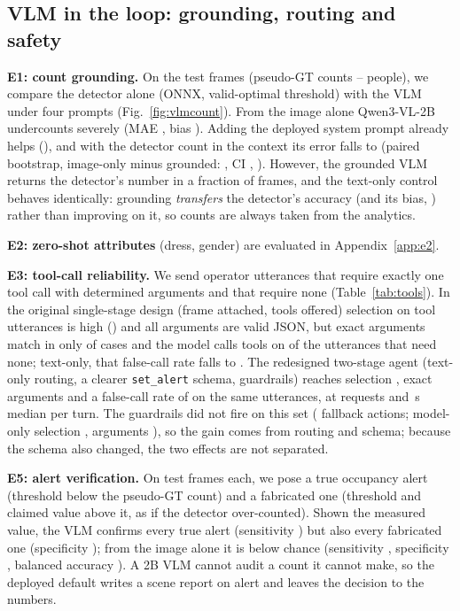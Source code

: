 \ifHaveVLM
\subsection{VLM in the loop: grounding, routing and safety}
\label{sec:vlm}
\ifHaveVLMEOne
\textbf{E1: count grounding.} On the \EoFrames{} test frames (pseudo-GT counts \EoGtMin--\EoGtMax{} people), we
compare the detector alone (ONNX, valid-optimal threshold) with the VLM under four prompts
(Fig.~\ref{fig:vlmcount}). From the image alone Qwen3-VL-2B undercounts severely
(MAE \EoMaeB, bias \EoBiasB). Adding the deployed system prompt already helps (\EoMaeBsys), and with the detector
count in the context its error falls to \EoMaeC{} (paired bootstrap, image-only minus grounded: \EoDeltaBC,
CI \ci{\EoDeltaLoBC}{\EoDeltaHiBC}, \EoPvalBC). However, the grounded VLM returns the detector's number in a
fraction \EoCopyC{} of frames, and the text-only control behaves identically: grounding \emph{transfers} the
detector's accuracy (and its bias, \EoBiasA) rather than improving on it, so counts are always taken from the
analytics.
\fi

\ifHaveVLMETwo
\textbf{E2: zero-shot attributes} (dress, gender) are evaluated in Appendix~\ref{app:e2}.
\fi

\ifHaveVLMEThree
\textbf{E3: tool-call reliability.} We send \EthNTool{} operator utterances that require exactly one tool call
with determined arguments and \EthNNoTool{} that require none (Table~\ref{tab:tools}). In the original
single-stage design (frame attached, tools offered) selection on tool utterances is high (\EthSelToolFrame) and
all arguments are valid JSON, but exact arguments match in only \EthArgFrame{} of cases and the model calls tools
on \EthFpFrame{} of the utterances that need none; text-only, that false-call rate falls to \EthFpText.
\ifHaveVLMEThreeB
The redesigned two-stage agent (text-only routing, a clearer \texttt{set\_alert} schema, guardrails) reaches
selection \EtbSel, exact arguments \EtbArg{} and a false-call rate of \EtbFp{} on the same utterances, at
\EtbReq{} requests and \EtbLat\,s median per turn. The guardrails did not fire on this set (\EtbFallback{}
fallback actions; model-only selection \EtbMoSel, arguments \EtbMoArg), so the gain comes from routing and schema;
because the schema also changed, the two effects are not separated.
\fi
\fi

\ifHaveVLMEFive
\textbf{E5: alert verification.} On \EvN{} test frames each, we pose a true occupancy alert (threshold below the
pseudo-GT count) and a fabricated one (threshold and claimed value above it, as if the detector over-counted).
Shown the measured value, the VLM confirms every true alert (sensitivity \EvSensInformed) but also every fabricated
one (specificity \EvSpecInformed\ci{\EvSpecLoInformed}{\EvSpecHiInformed}); from the image alone it is below chance
(sensitivity \EvSensBlind, specificity \EvSpecBlind, balanced accuracy \EvBalBlind). A 2B VLM cannot audit a
count it cannot make, so the deployed default writes a scene report on alert and leaves the decision to the
numbers.
\fi


